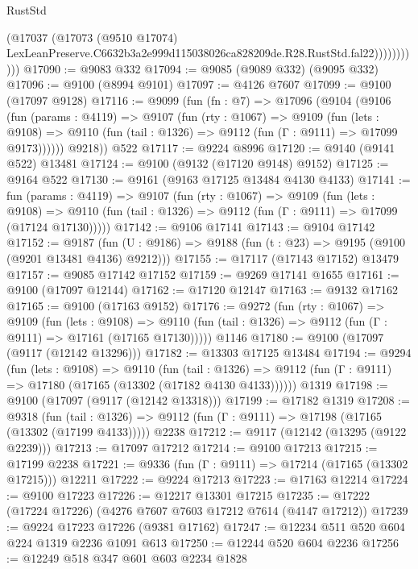 \begin{lexlean}{RustStd}
\begin{coremodule}
                      (@17037
                        (@17073
                          (@9510 @17074)
                          LexLeanPreserve.C6632b3a2e999d115038026ca828209de.R28.RustStd.fal22)))))))))))
@17090 := @9083 @332
@17094 := @9085 (@9089 @332) (@9095 @332)
@17096 := @9100 (@8994 @9101)
@17097 := @4126 @7607
@17099 := @9100 (@17097 @9128)
@17116 := @9099
    (fun (fn : @7) =>
    @17096
      (@9104
        (@9106
          (fun (params : @4119) =>
          @9107
            (fun (rty : @1067) =>
            @9109
              (fun (lets : @9108) =>
              @9110 (fun (tail : @1326) => @9112 (fun (Γ : @9111) => @17099 @9173))))))
        @9218))
    @522
@17117 := @9224 @8996
@17120 := @9140 (@9141 @522) @13481
@17124 := @9100 (@9132 (@17120 @9148) @9152)
@17125 := @9164 @522
@17130 := @9161 (@9163 @17125 @13484 @4130 @4133)
@17141 := fun (params : @4119) =>
  @9107
    (fun (rty : @1067) =>
    @9109
      (fun (lets : @9108) =>
      @9110 (fun (tail : @1326) => @9112 (fun (Γ : @9111) => @17099 (@17124 @17130)))))
@17142 := @9106 @17141
@17143 := @9104 @17142
@17152 := @9187
    (fun (U : @9186) => @9188 (fun (t : @23) => @9195 (@9100 (@9201 @13481 @4136) @9212)))
@17155 := @17117 (@17143 @17152) @13479
@17157 := @9085 @17142 @17152
@17159 := @9269 @17141 @1655
@17161 := @9100 (@17097 @12144)
@17162 := @17120 @12147
@17163 := @9132 @17162
@17165 := @9100 (@17163 @9152)
@17176 := @9272
    (fun (rty : @1067) =>
    @9109
      (fun (lets : @9108) =>
      @9110 (fun (tail : @1326) => @9112 (fun (Γ : @9111) => @17161 (@17165 @17130)))))
    @1146
@17180 := @9100 (@17097 (@9117 (@12142 @13296)))
@17182 := @13303 @17125 @13484
@17194 := @9294
    (fun (lets : @9108) =>
    @9110
      (fun (tail : @1326) =>
      @9112 (fun (Γ : @9111) => @17180 (@17165 (@13302 (@17182 @4130 @4133))))))
    @1319
@17198 := @9100 (@17097 (@9117 (@12142 @13318)))
@17199 := @17182 @1319
@17208 := @9318
    (fun (tail : @1326) => @9112 (fun (Γ : @9111) => @17198 (@17165 (@13302 (@17199 @4133)))))
    @2238
@17212 := @9117 (@12142 (@13295 (@9122 @2239)))
@17213 := @17097 @17212
@17214 := @9100 @17213
@17215 := @17199 @2238
@17221 := @9336 (fun (Γ : @9111) => @17214 (@17165 (@13302 @17215))) @12211
@17222 := @9224 @17213
@17223 := @17163 @12214
@17224 := @9100 @17223
@17226 := @12217 @13301 @17215
@17235 := @17222 (@17224 @17226) (@4276 @7607 @7603 @17212 @7614 (@4147 @17212))
@17239 := @9224 @17223 @17226 (@9381 @17162)
@17247 := @12234 @511 @520 @604 @224 @1319 @2236 @1091 @613
@17250 := @12244 @520 @604 @2236
@17256 := @12249 @518 @347 @601 @603 @2234 @1828

\end{coremodule}
\end{lexlean}
